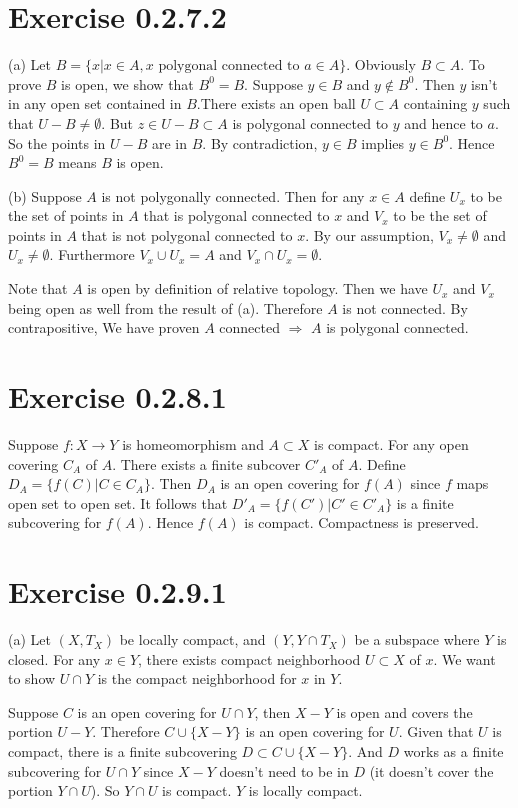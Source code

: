 \documentclass[12pt]{article}
\begin{document}
\section*{Exercise 0.2.7.2}
(a) Let $B = \{ x | x \in A, x \mbox{ polygonal connected to } a \in A \}$. Obviously $B \subset A$. To prove $B$ is open, we show that $B^0 = B$. Suppose $y \in B$ and $y \notin B^0$. Then $y$ isn't in any open set contained in $B$.There exists an open ball $U \subset A$ containing $y$ such that $U-B \neq \emptyset$. But $z \in U - B \subset A$ is polygonal connected to $y$ and hence to $a$. So the points in $U-B$ are in $B$. By contradiction, $y \in B $ implies $y \in B^0$. Hence $B^0 = B$ means $B$ is open. \QED

(b) Suppose $A$ is not polygonally connected. Then for any $x \in A$ define $U_x$ to be the set of points in $A$ that is polygonal connected to $x$ and $V_x$ to be the set of points in $A$ that is not polygonal connected to $x$. By our assumption, $V_x \neq \emptyset$ and $U_x \neq \emptyset$. Furthermore $V_x \cup U_x = A$ and  $V_x \cap U_x = \emptyset$. 

Note that $A$ is open by definition of relative topology. Then we have $U_x$ and $V_x$ being open as well from the result of (a). Therefore $A$ is not connected. By contrapositive, We have proven $A$ connected $\Rightarrow$ $A$ is polygonal connected. \QED

\section*{Exercise 0.2.8.1}
Suppose $f: X \rightarrow Y$ is homeomorphism and $A \subset X$ is compact. For any open covering $C_A$ of $A$. There exists a finite subcover $C'_A$ of $A$. Define $D_A = \{ f(C) | C \in C_A \}$. Then $D_A$ is an open covering for $f(A)$ since $f$ maps open set to open set. It follows that $D'_A = \{f(C') | C' \in C'_A \}$ is a finite subcovering for $f(A)$. Hence $f(A)$ is compact. Compactness is preserved.
\QED 

\section*{Exercise 0.2.9.1}
(a) Let $(X, T_X)$ be locally compact, and $(Y, Y\cap T_X)$ be a subspace where $Y$ is closed. For any $x \in Y$, there exists compact neighborhood $U \subset X$ of $x$.
We want to show $U \cap Y$ is the compact neighborhood for $x$ in $Y$.

Suppose $C$ is an open covering for $U \cap Y$,  then $X - Y$ is open and covers the portion $U - Y$. Therefore $C \cup \{X - Y\}$ is an open covering for $U$. Given that $U$ is compact, there is a finite subcovering $D \subset C \cup \{X - Y\}$. And $D$ works as a finite subcovering for $U \cap Y$ since $X - Y$ doesn't need to be in $D$ (it doesn't cover the portion $Y \cap U$). So $Y \cap U$ is compact. $Y$ is locally compact.  \QED 
\end{document}
